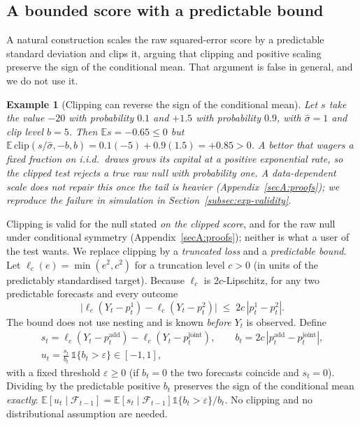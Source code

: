 \documentclass[pdflatex,sn-mathphys-ay]{sn-jnl}%
\theoremstyle{thmstyleone}%
\theoremstyle{thmstyletwo}%
\newtheorem{example}{Example}%
\theoremstyle{thmstylethree}%
\newcommand{\E}{\mathbb{E}}
\newcommand{\F}{\mathcal{F}}
\newcommand{\clip}{\mathrm{clip}}
\newcommand{\indic}{\mathbb{1}}
\begin{document}
\subsection{A bounded score with a predictable bound}\label{subsec:score-sg}

A natural construction scales the raw squared-error score by a predictable standard
deviation and clips it, arguing that clipping and positive scaling preserve the
sign of the conditional mean. That argument is false in general, and we do not use it.

\begin{example}[Clipping can reverse the sign of the conditional mean]\label{ex:clipfail}
Let $s$ take the value $-20$ with probability $0.1$ and $+1.5$ with probability $0.9$, with
$\hat\sigma=1$ and clip level $b=5$. Then $\E s=-0.65\le0$ but
$\E\,\clip(s/\hat\sigma,-b,b)=0.1(-5)+0.9(1.5)=+0.85>0$. A bettor that wagers a fixed
fraction on i.i.d.\ draws grows its capital at a positive exponential rate, so the clipped
test rejects a true raw null with probability one. A data-dependent scale does not
repair this once the tail is heavier (Appendix~\ref{secA:proofs}); we reproduce the
failure in simulation in Section~\ref{subsec:exp-validity}.
\end{example}

Clipping is valid for the null stated \emph{on the clipped score}, and for the raw null under
conditional symmetry (Appendix~\ref{secA:proofs}); neither is what a user of the test wants.
We replace clipping by a \emph{truncated loss} and a \emph{predictable bound}. Let
$\ell_c(e)=\min(e^2,c^2)$ for a truncation level $c>0$ (in units of the predictably
standardised target). Because $\ell_c$ is $2c$-Lipschitz, for any two predictable
forecasts and every outcome
\begin{equation}\label{eq:bound}
\bigl|\ell_c(Y_t-p^{1}_t)-\ell_c(Y_t-p^{2}_t)\bigr|\;\le\;2c\,|p^{1}_t-p^{2}_t|.
\end{equation}
The bound does not use nesting and is known \emph{before} $Y_t$ is observed. Define
\begin{equation}\label{eq:sg-score}
\begin{gathered}
s_t=\ell_c(Y_t-p^{\mathrm{add}}_t)-\ell_c(Y_t-p^{\mathrm{joint}}_t),\qquad
b_t=2c\,|p^{\mathrm{add}}_t-p^{\mathrm{joint}}_t|,\\
u_t=\frac{s_t}{b_t}\,\indic\{b_t>\varepsilon\}\in[-1,1],
\end{gathered}
\end{equation}
with a fixed threshold $\varepsilon\ge0$ (if $b_t=0$ the two forecasts coincide and
$s_t=0$). Dividing by the predictable positive $b_t$ preserves the sign of the conditional
mean \emph{exactly}: $\E[u_t\mid\F_{t-1}]=\E[s_t\mid\F_{t-1}]\indic\{b_t>\varepsilon\}/b_t$.
No clipping and no distributional assumption are needed.
\end{document}
